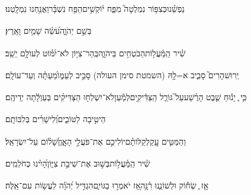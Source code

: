 \documentclass[12pt]{article}
\newcommand{\loc}[1]{\textsuperscript{\locf{#1}}}
\begin{document}
{\loc{ ז}~}‏נַפְשֵׁ֗נוּ{\hfill}כְּצִפּ֥וֹר נִמְלְטָה֮ מִפַּ֢ח י֫וֹקְשִׁ֥ים\newline\hspace*{.5em}הַפַּ֥ח נִשְׁבָּ֗ר{\hfill}וַאֲנַ֥חְנוּ נִמְלָֽטְנוּ׃\par

{\loc{ ח}~}‏ בְּשֵׁ֣ם יְהֹוָ֑ה{\hfill}עֹ֝שֵׂ֗ה שָׁמַ֥יִם וָאָֽרֶץ׃\par\pend

\pstart[\subsection*{\textcolor{red}{פרק קכה}}]\label{פרק קכה}
{\loc{ א}~}‏שִׁ֗יר הַֽמַּ֫עֲל֥וֹת\newline\hspace*{.5em}הַבֹּטְחִ֥ים בַּיהֹוָ֑ה{\hfill}כְּֽהַר־צִיּ֥וֹן לֹא־יִ֝מּ֗וֹט לְעוֹלָ֥ם יֵשֵֽׁב׃\par

{\loc{ ב}~}‏יְֽרוּשׁ{\hfill}הָרִים֮ סָבִ֢יב א=לָ֥הּ (השמטת סימן העולה)\newline\hspace*{.5em} סָבִ֣יב לְעַמּ֑וֹ{\hfill}מֵ֝עַתָּ֗ה וְעַד־עוֹלָֽם׃\par

{\loc{ ג}~}‏כִּ֤י ֪ יָנ֡וּחַ שֵׁ֤בֶט הָרֶ֗שַׁע{\hfill}עַל֮ גּוֹרַ֢ל הַֽצַּדִּ֫יקִ֥ים\newline\hspace*{.5em}לְמַ֡עַן{\hfill}לֹא־יִשְׁלְח֖וּ הַצַּדִּיקִ֨ים בְּעַוְלָ֬תָה יְדֵיהֶֽם׃\par

{\loc{ ד}~}‏הֵיטִ֣יבָה  לַטּוֹבִ֑ים{\hfill}וְ֝לִישָׁרִ֗ים בְּלִבּוֹתָֽם׃\par

{\loc{ ה}~}‏וְהַמַּטִּ֤ים עֲֽקַלְקַלּוֹתָ֗ם{\hfill}יוֹלִיכֵ֣ם \newline\hspace*{.5em}אֶת־פֹּעֲלֵ֣י הָאָ֑וֶן{\hfill}שָׁ֝ל֗וֹם עַל־יִשְׂרָאֵֽל׃\par\pend
\ledpb
\pstart[\subsection*{\textcolor{red}{פרק קכו}}]\label{פרק קכו}
{\loc{ א}~}‏שִׁ֗יר הַֽמַּ֫עֲל֥וֹת\newline\hspace*{.5em}בְּשׁ֣וּב  אֶת־שִׁיבַ֣ת צִיּ֑וֹן{\hfill}הָ֝יִ֗ינוּ כְּחֹלְמִֽים׃\par

{\loc{ ב}~}‏אָ֤ז ֪ שְׂח֡וֹק {\hfill}וּלְשׁוֹנֵ֢נוּ רִ֫נָּ֥ה\newline\hspace*{.5em}אָ֭ז יֹאמְר֣וּ בַגּוֹיִ֑ם{\hfill}הִגְדִּ֥יל יְ֝הֹוָ֗ה לַעֲשׂ֥וֹת עִם־אֵֽלֶּה׃\par
\end{document}
